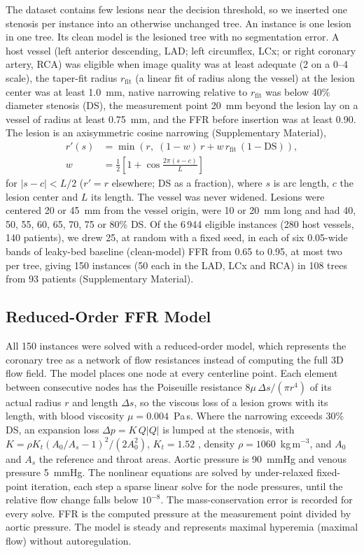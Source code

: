 \documentclass[journal,twoside,web]{ieeecolor}
\begin{document}
The dataset contains few lesions near the decision threshold, so we inserted one stenosis per instance into an
otherwise unchanged tree. An instance is one lesion in one tree. Its clean model is the lesioned tree with no segmentation error. A host vessel (left anterior descending, LAD; left circumflex, LCx; or right coronary artery, RCA) was eligible
when image quality was at least adequate (2 on a 0--4 scale), the taper-fit radius $r_\mathrm{fit}$ (a linear fit of radius along the vessel) at the
lesion center was at least 1.0~mm, native narrowing relative to $r_\mathrm{fit}$ was below 40\% diameter stenosis (DS),
the measurement point 20~mm beyond the lesion lay on a vessel of radius at least 0.75~mm, and the FFR before
insertion was at least 0.90. The lesion is an axisymmetric cosine narrowing (Supplementary Material),
\begin{equation}
\begin{aligned}
r'(s) &= \min\!\left(r,\; (1-w)\,r + w\,r_\mathrm{fit}\,(1-\mathrm{DS})\right),\\
w &= \tfrac{1}{2}\left[1+\cos\tfrac{2\pi (s-c)}{L}\right]
\end{aligned}
\end{equation}
for $|s-c|<L/2$ ($r'=r$ elsewhere; DS as a fraction), where $s$ is arc length, $c$ the lesion center and $L$ its length. The vessel was never widened.
Lesions were centered 20 or 45~mm from the vessel origin, were 10 or 20~mm long and had 40, 50, 55, 60, 65, 70, 75
or 80\% DS. Of the 6\,944 eligible instances (280 host vessels, 140 patients), we drew 25, at random with a fixed seed, in each of six 0.05-wide bands of
leaky-bed baseline (clean-model) FFR from 0.65 to 0.95, at most two per tree, giving 150 instances (50 each in the LAD, LCx and RCA) in 108 trees from 93
patients (Supplementary Material).

\subsection{Reduced-Order FFR Model}
All 150 instances were solved with a reduced-order model, which represents the coronary tree as a network of flow
resistances instead of computing the full 3D flow field. The model places one node at every centerline point. Each element between consecutive nodes has the Poiseuille
resistance $8\mu\,\Delta s/(\pi r^4)$ of its actual radius $r$ and length $\Delta s$, so the viscous loss of a lesion grows with its length, with blood viscosity
$\mu = 0.004$~Pa\,s. Where the narrowing exceeds 30\% DS, an expansion loss $\Delta p = K\,Q|Q|$ is lumped at the
stenosis, with $K = \rho K_t (A_0/A_s - 1)^2 / (2A_0^2)$, $K_t = 1.52$ \cite{young1973}, density
$\rho = 1060$~kg\,m$^{-3}$, and $A_0$ and $A_s$ the reference and throat areas. Aortic pressure is 90~mmHg and
venous pressure 5~mmHg. The nonlinear equations are solved by under-relaxed fixed-point iteration, each step a sparse linear
solve for the node pressures, until the relative flow change falls below $10^{-8}$. The mass-conservation error is recorded for every solve. FFR is the computed
pressure at the measurement point divided by aortic pressure. The model is steady and represents maximal hyperemia
(maximal flow) without autoregulation.
\end{document}
